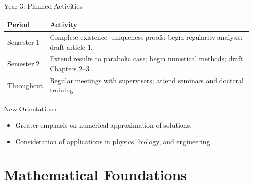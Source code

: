 \documentclass[11pt]{beamer}
\begin{document}
	\begin{frame}{Year 3: Planned Activities}
		\begin{table}[h!]
			\centering
			\renewcommand{\arraystretch}{1.3}
			\small
			\begin{tabular}{@{}p{} p{}@{}}
				\toprule
				\textbf{Period} & \textbf{Activity} \\
				\midrule
				Semester 1 & Complete existence, uniqueness proofs; begin regularity analysis; draft article 1. \\
				Semester 2 & Extend results to parabolic case; begin numerical methods; draft Chapters 2--3. \\
				Throughout & Regular meetings with supervisors; attend seminars and doctoral training. \\
				\bottomrule
			\end{tabular}
		\end{table}
		
		\vspace{0.3cm}
		
		\begin{block}{New Orientations}
			\begin{itemize}
				\item Greater emphasis on numerical approximation of solutions.
				\item Consideration of applications in physics, biology, and engineering.
			\end{itemize}
		\end{block}
	\end{frame}
	
	\section{Mathematical Foundations}
	
\end{document}
